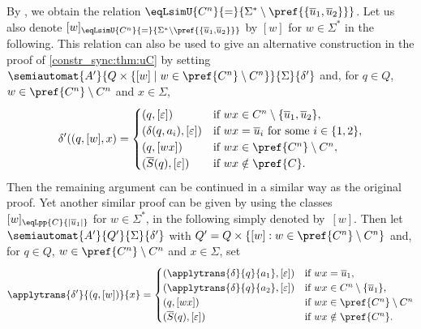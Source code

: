 \begin{remark}
	By ,
	we obtain the relation
	$\eqLsimU{C^n}{=}{\Sigma^* \setminus \pref{\{\overline{u}_1, \overline{u}_2\}}}$. 
	Let us also denote $[w]_{\eqLsimU{C^n}{=}{\Sigma^* \setminus \pref{\{\overline{u}_1, \overline{u}_2\}}}}$
	by $[w]$ for $w \in \Sigma^*$ in the following.
	This relation can also be used to give an alternative construction
	in the proof of \cref{constr_sync:thm:uC}
	by setting $\semiautomat{A'}{Q \times \{ [w] \mid w \in \pref{C^n} \setminus C^n\}}{\Sigma}{\delta'}$
	and, for $q \in Q$, $w \in \pref{C^n}\setminus C^n$ and $x \in \Sigma$, 
	\[
	\delta'((q, [w], x)
	= \begin{cases}
		(q, [\varepsilon]) &\text{if } wx \in C^n \setminus \{\overline{u}_1, \overline{u}_2\}, \\
		(\delta(q, a_i), [\varepsilon]) & \text{if } wx = \overline{u}_i \text{ for some } i \in \{1,2\}, \\
		(q, [wx]) & \text{if } wx \in \pref{C^n} \setminus C^n, \\
		(\overline{S}(q), [\varepsilon]) & \text{if } wx \notin \pref{C}.		 		
	\end{cases}
	\]
	Then the remaining argument can be continued in a similar way as the original proof.	
	Yet another similar proof can be given
	by using the classes 
	$[w]_{\eqLpp{C}{|\overline{u}_1|}}$
	for $w \in \Sigma^*$, in the following simply denoted by~$[w]$.
	Then 
	let $\semiautomat{A'}{Q'}{\Sigma}{\delta'}$
	with $Q' = Q \times \{ [w]  : w \in \pref{C^n} \setminus C^n \}$
	and, for $q \in Q$, $w \in \pref{C^n}\setminus C^n$ and $x \in \Sigma$, set
	\[
	\applytrans{\delta'}{(q, [w])}{x} = 
	\begin{cases}
		(\applytrans{\delta}{q}{a_1}, [\varepsilon]) & \text{if } wx = \overline{u}_1, \\
		(\applytrans{\delta}{q}{a_2}, [\varepsilon]) & \text{if } wx \in C^n \setminus \{ \overline{u}_1 \}, \\
		(q, [wx])                                    & \text{if } wx \in \pref{C^n} \setminus C^n \\
		(\overline{S}(q), [\varepsilon]) & \text{if } wx \notin \pref{C^n}.	
	\end{cases}
	\]
\end{remark}

